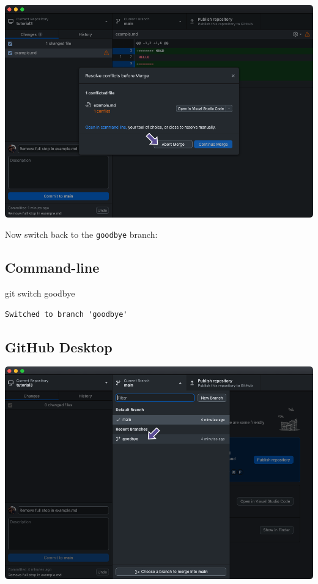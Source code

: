 \documentclass[
  letterpaper,
  DIV=11,
  numbers=noendperiod]{scrartcl}
\newenvironment{Shaded}{\begin{snugshade}}{\end{snugshade}}
\newcommand{\FunctionTok}[1]{\textcolor[rgb]{0.28,0.35,0.67}{#1}}
\newcommand{\NormalTok}[1]{\textcolor[rgb]{0.00,0.23,0.31}{#1}}
\begin{document}
\includegraphics{images/image64.png}

Now switch back to the \texttt{goodbye} branch:

\subsection{Command-line}

\begin{Shaded}
\begin{Highlighting}[]
\FunctionTok{git}\NormalTok{ switch goodbye}
\end{Highlighting}
\end{Shaded}

\begin{verbatim}
Switched to branch 'goodbye'
\end{verbatim}

\subsection{GitHub Desktop}

\includegraphics{images/image65.png}
\end{document}

